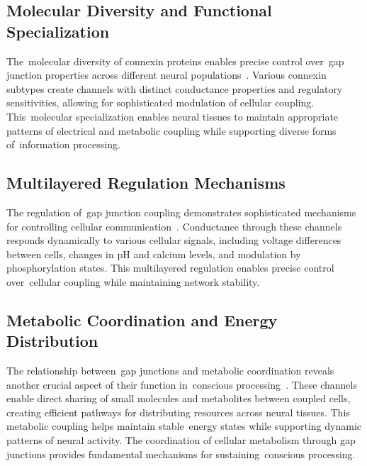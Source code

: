 \subsection*{Molecular Diversity and Functional Specialization~~}

The~molecular diversity of connexin proteins enables precise control over~gap junction properties across different neural populations~\cite{Willecke2002, Nagy2018}. Various connexin subtypes create channels with distinct conductance properties and regulatory sensitivities, allowing for sophisticated modulation of cellular coupling. This~molecular specialization enables neural tissues to maintain appropriate patterns of electrical and metabolic coupling while supporting diverse forms of~information processing.

\subsection*{Multilayered Regulation Mechanisms~}

The regulation of~gap junction coupling demonstrates sophisticated mechanisms for controlling cellular communication~\cite{Nagy2018, Giaume2010}. Conductance through these channels responds dynamically to various cellular signals, including voltage differences between cells, changes in pH and calcium levels, and modulation by phosphorylation states. This multilayered regulation enables precise control over~cellular coupling while maintaining network stability.

\subsection*{Metabolic Coordination and Energy Distribution~~}

The relationship between~gap junctions and metabolic coordination reveals another crucial aspect of their function in~conscious processing~\cite{Hormuzdi2004, Attwell2001}. These channels enable direct sharing of small molecules and metabolites between coupled cells, creating efficient pathways for distributing resources across neural tissues. This metabolic coupling helps maintain stable~energy states while supporting dynamic patterns of neural activity. The coordination of cellular metabolism through gap junctions provides fundamental mechanisms for sustaining~conscious processing.


